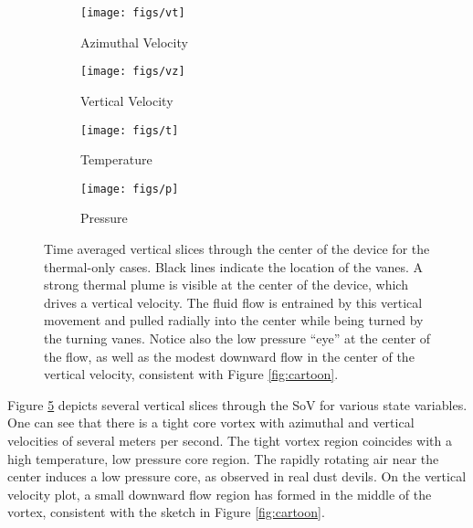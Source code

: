 \begin{figure}[htb]

 \begin{subfigure}{.5\textwidth}
  \centering
  \texttt{[image: figs/vt]}
  \caption{Azimuthal Velocity}
  \label{fig:vt-to}
 \end{subfigure}%
 \begin{subfigure}{.5\textwidth}
  \centering
  \texttt{[image: figs/vz]}
  \caption{Vertical Velocity}
  \label{fig:vz-to}
 \end{subfigure}%


 \begin{subfigure}{.5\textwidth}
  \centering
  \texttt{[image: figs/t]}
  \caption{Temperature}
  \label{fig:t-to}
 \end{subfigure}%
 \begin{subfigure}{.5\textwidth}
  \centering
  \texttt{[image: figs/p]}
  \caption{Pressure}
  \label{fig:p-to}
 \end{subfigure}%

 \caption{Time averaged vertical slices through the center of the device
 for the thermal-only cases. Black lines indicate the location of the
 vanes. A strong thermal plume is visible at the center of the device,
 which drives a vertical velocity. The fluid flow is entrained by this
 vertical movement and pulled radially into the center while being
 turned by the turning vanes. Notice also the low pressure ``eye'' at
 the center of the flow, as well as the modest downward flow in the
 center of the vertical velocity, consistent with Figure \ref{fig:cartoon}.}
 \label{fig:to-vert}
\end{figure}

%
%
%
Figure \ref{fig:to-vert} depicts several vertical slices through the SoV
for various state variables. One can see that there is a tight core
vortex with azimuthal and vertical velocities of several meters per
second. The tight vortex region coincides with a high temperature, low
pressure core region. The rapidly rotating air near the center induces
a low pressure core, as observed in real dust devils.
On the vertical velocity plot, a small downward flow region has formed in
the middle of the vortex, consistent with the sketch in Figure
\ref{fig:cartoon}.  

